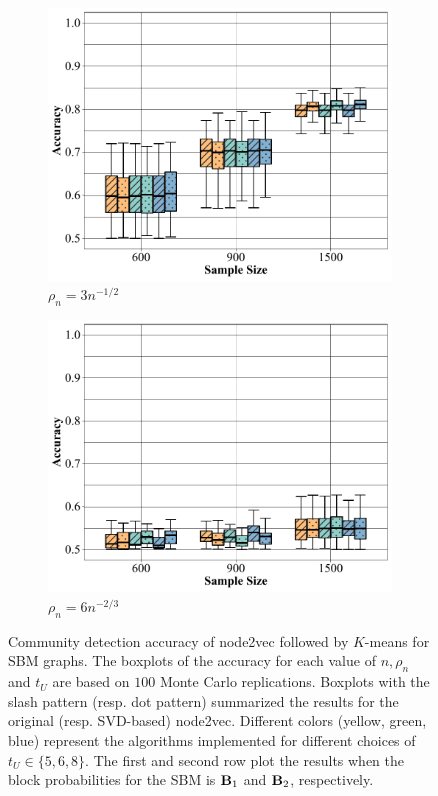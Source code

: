 \documentclass[10pt,journal,compsoc]{IEEEtran}
\newcommand{\M}[1]{{{\mathbf{\MakeUppercase{#1}}}}}
\numberwithin{equation}{section}
\begin{document}
\begin{figure}[htbp]
\begin{subfigure}{.6\columnwidth}
\includegraphics[width=\columnwidth]{boxplot/b_12.pdf}%
\caption{$\rho_n = 3n^{-1/2}$}
\label{12:2}
\end{subfigure}
\begin{subfigure}{.6\columnwidth}
\includegraphics[width=\columnwidth]{boxplot/b_23.pdf}%
\caption{$\rho_n = 6n^{-2/3}$}
\label{subfig:special2}
\end{subfigure}
\caption{Community detection accuracy of node2vec followed by
    $K$-means for SBM graphs. The
    boxplots of the accuracy for each value of $n, \rho_n$ and $
    t_U$ are based on $100$ Monte Carlo replications. Boxplots with the slash pattern (resp. dot pattern) summarized the results for the original (resp. SVD-based) node2vec. Different colors (yellow, green, blue) represent the algorithms implemented for different choices of $t_U \in \{5,6,8\}$. The first and second row
    plot the results when the block probabilities for the SBM is $\M B_1$ and $\M
    B_2$, respectively.}
\label{box:1}
\end{figure}
\end{document}
